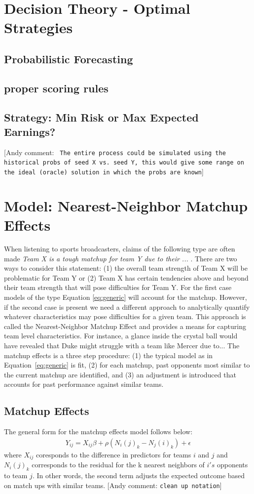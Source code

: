 \documentclass[11pt]{article} %
\newcommand{\andyc}[1]{[{\color{red}\sc Andy comment: {\tt #1}}]}
\begin{document}
\section{Decision Theory - Optimal Strategies}
\subsection{Probabilistic Forecasting}
\subsection{proper scoring rules}
\subsection{Strategy: Min Risk or Max Expected Earnings?}
\andyc{ The entire process could be simulated using the historical probs of seed X vs. seed Y, this would give some range on the ideal (oracle) solution in which the probs are known}
\section{Model: Nearest-Neighbor Matchup Effects}
When listening to sports broadcasters, claims of the following type are often made \emph{Team X is a tough matchup for team Y due to their ... }.  There are two ways to consider this statement: (1) the overall team strength of Team X will be problematic for Team Y or (2) Team X has certain tendencies above and beyond their team strength that will pose difficulties for Team Y.  For the first case models of the type Equation \ref{eq:generic} will account for the matchup.  However, if the second case is present we need a different approach to analytically quantify whatever characteristics may pose difficulties for a given team.  This approach is called the Nearest-Neighbor Matchup Effect and provides a means for capturing team level characteristics.  For instance, a glance inside the crystal ball would have revealed that Duke might struggle with a team like Mercer due to...  The matchup effects is a three step procedure: (1)  the typical model as in Equation~\ref{eq:generic} is fit, (2) for each matchup, past opponents most similar to the current matchup are identified, and (3) an adjustment is introduced that accounts for past performance against similar teams. 
\subsection{Matchup Effects}
The general form for the matchup effects model follows below:
\begin{eqnarray}
Y_{ij} = X_{ij} \beta + \rho( N_i(j)_k-N_j(i)_k) + \epsilon
\label{eq:ME}
\end{eqnarray}
where $X_{ij}$ coresponds to the difference in predictors for teams $i$ and $j$ and $ N_i(j)_k$ corresponds to the residual for the k nearest neighbors of $i's$ opponents to team $j$.  In other words, the second term adjusts the expected outcome based on match ups with similar teams.
\andyc{clean up notation}
\end{document}
